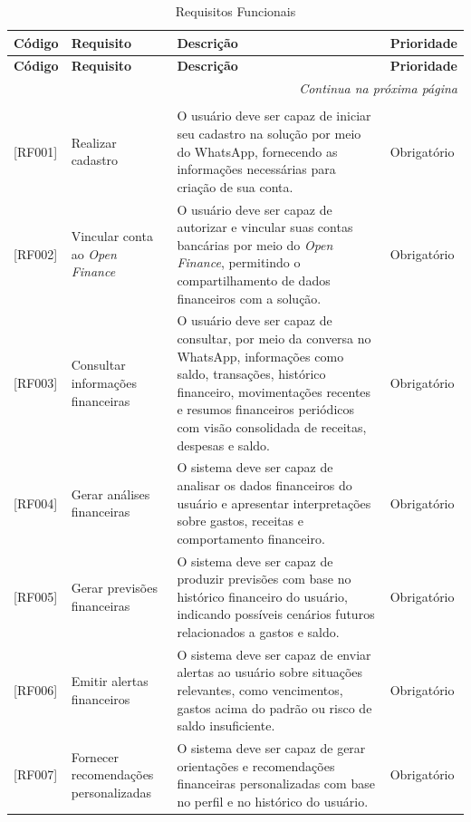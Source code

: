     \begin{longtable}{|p{1.5cm}|p{3.2cm}|p{7.3cm}|p{2.1cm}|}
    \caption{Requisitos Funcionais} \label{quad:rf} \\
    \hline
    \textbf{Código} & \textbf{Requisito} & \textbf{Descrição} & \textbf{Prioridade} \\ \hline
    \endfirsthead
    \hline
    \textbf{Código} & \textbf{Requisito} & \textbf{Descrição} & \textbf{Prioridade} \\ \hline
    \endhead
    \hline
    \multicolumn{4}{r}{\fontsize{10pt}{10pt}\selectfont\textit{Continua na próxima página}} \\
    \endfoot
    \hline
    \multicolumn{4}{c}{\fontsize{10pt}{10pt}\selectfont \textbf{Fonte:} Elaborado pelos autores (2026).} \\
    \endlastfoot
    {[RF001]} & Realizar cadastro & O usuário deve ser capaz de iniciar seu cadastro na solução por meio do WhatsApp, fornecendo as informações necessárias para criação de sua conta. & Obrigatório \\ \hline
    {[RF002]} & Vincular conta ao \textit{Open Finance} & O usuário deve ser capaz de autorizar e vincular suas contas bancárias por meio do \textit{Open Finance}, permitindo o compartilhamento de dados financeiros com a solução. & Obrigatório \\ \hline
    {[RF003]} & Consultar informações financeiras & O usuário deve ser capaz de consultar, por meio da conversa no WhatsApp, informações como saldo, transações, histórico financeiro, movimentações recentes e resumos financeiros periódicos com visão consolidada de receitas, despesas e saldo. & Obrigatório \\ \hline
    {[RF004]} & Gerar análises financeiras & O sistema deve ser capaz de analisar os dados financeiros do usuário e apresentar interpretações sobre gastos, receitas e comportamento financeiro. & Obrigatório \\ \hline
    {[RF005]} & Gerar previsões financeiras & O sistema deve ser capaz de produzir previsões com base no histórico financeiro do usuário, indicando possíveis cenários futuros relacionados a gastos e saldo. & Obrigatório \\ \hline
    {[RF006]} & Emitir alertas financeiros & O sistema deve ser capaz de enviar alertas ao usuário sobre situações relevantes, como vencimentos, gastos acima do padrão ou risco de saldo insuficiente. & Obrigatório \\ \hline
    {[RF007]} & Fornecer recomendações personalizadas & O sistema deve ser capaz de gerar orientações e recomendações financeiras personalizadas com base no perfil e no histórico do usuário. & Obrigatório \\ \hline

\end{longtable}
